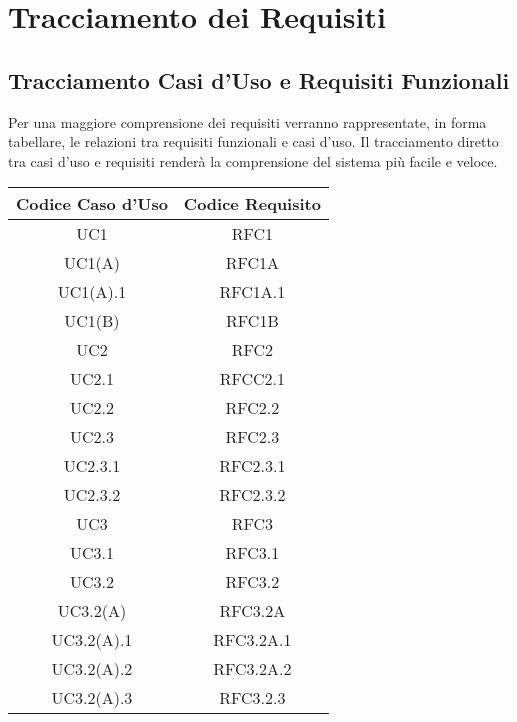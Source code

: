 \section{Tracciamento dei Requisiti}

\subsection{Tracciamento Casi d'Uso e Requisiti Funzionali}
Per una maggiore comprensione dei requisiti verranno rappresentate, in forma tabellare, le relazioni tra requisiti funzionali e casi d'uso. Il tracciamento diretto tra casi d'uso e requisiti renderà la comprensione del sistema più facile e veloce.
\clearpage

\begin{table}[!htbp] %
            \centering
            \renewcommand{\arraystretch}{2} %
            \begin{tabular}{|c|c|} %
                \rowcolor{orange!50} %
        		\hline
        		\textbf{Codice Caso d'Uso} & \textbf{Codice Requisito} \\
                \hline
                UC1 & RFC1\\
                \hline
                UC1(A) & RFC1A\\
                \hline
                UC1(A).1 & RFC1A.1\\
                \hline
                UC1(B) & RFC1B\\
                \hline
                UC2 & RFC2\\
                \hline
                UC2.1 & RFCC2.1\\
                \hline
                UC2.2 & RFC2.2\\
                \hline
                UC2.3 & RFC2.3\\
                \hline
                UC2.3.1 & RFC2.3.1\\
                \hline
                UC2.3.2 & RFC2.3.2\\
                \hline
                UC3 & RFC3\\
                \hline
                UC3.1 & RFC3.1\\
                \hline
                UC3.2 & RFC3.2\\
                \hline
                UC3.2(A)& RFC3.2A\\
                \hline
                UC3.2(A).1 & RFC3.2A.1\\
                \hline
                UC3.2(A).2 & RFC3.2A.2\\
                \hline
                UC3.2(A).3 & RFC3.2.3\\
                \hline
                \end{tabular}
        \end{table}

